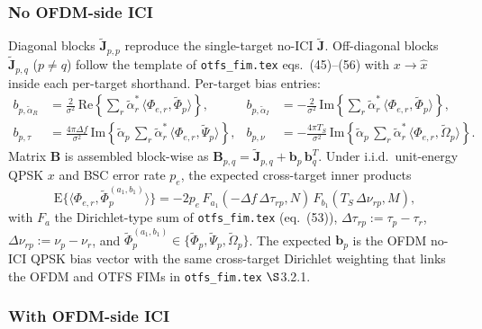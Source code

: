 \documentclass[11pt]{article}
\begin{document}
\subsubsection{No OFDM-side ICI}

Diagonal blocks \(\tilde{\bm{J}}_{p,p}\) reproduce the single-target no-ICI \(\tilde{\bm{J}}\). Off-diagonal blocks \(\tilde{\bm{J}}_{p,q}\) (\(p \neq q\)) follow the template of \texttt{otfs\_fim.tex} eqs.~(45)--(56) with \(x \to \hat{x}\) inside each per-target shorthand. Per-target bias entries:
\begin{align}
    b_{p, \tilde{\alpha}_R} &= \tfrac{2}{\sigma^2}\, \mathrm{Re}\!\left\{ \sum_r \tilde{\alpha}_r^*\, \langle \Phi_{e,r}, \tilde{\Phi}_p\rangle \right\}, &
    b_{p, \tilde{\alpha}_I} &= -\tfrac{2}{\sigma^2}\, \mathrm{Im}\!\left\{ \sum_r \tilde{\alpha}_r^*\, \langle \Phi_{e,r}, \tilde{\Phi}_p\rangle \right\}, \\
    b_{p, \tau} &= \tfrac{4\pi\Delta f}{\sigma^2}\, \mathrm{Im}\!\left\{ \tilde{\alpha}_p\, \sum_r \tilde{\alpha}_r^*\, \langle \Phi_{e,r}, \tilde{\Psi}_p\rangle \right\}, &
    b_{p, \nu} &= -\tfrac{4\pi T_S}{\sigma^2}\, \mathrm{Im}\!\left\{ \tilde{\alpha}_p\, \sum_r \tilde{\alpha}_r^*\, \langle \Phi_{e,r}, \tilde{\Omega}_p\rangle \right\}.
\end{align}
Matrix \(\bm{B}\) is assembled block-wise as \(\bm{B}_{p,q} = \tilde{\bm{J}}_{p,q} + \bm{b}_p\, \bm{b}_q^T\). Under i.i.d.\ unit-energy QPSK \(x\) and BSC error rate \(p_e\), the expected cross-target inner products
\begin{equation}
    \mathrm{E}\{\langle \Phi_{e,r}, \tilde{\Phi}_p^{(a_1,b_1)}\rangle\} = -2 p_e\, F_{a_1}(-\Delta f\, \Delta\tau_{rp}, N)\, F_{b_1}(T_S\, \Delta\nu_{rp}, M),
\end{equation}
with \(F_a\) the Dirichlet-type sum of \texttt{otfs\_fim.tex} (eq.~(53)), \(\Delta\tau_{rp} := \tau_p - \tau_r\), \(\Delta\nu_{rp} := \nu_p - \nu_r\), and \(\tilde{\Phi}_p^{(a_1,b_1)} \in \{\tilde{\Phi}_p, \tilde{\Psi}_p, \tilde{\Omega}_p\}\). The expected \(\bm{b}_p\) is the OFDM no-ICI QPSK bias vector with the same cross-target Dirichlet weighting that links the OFDM and OTFS FIMs in \texttt{otfs\_fim.tex} \(\S\)3.2.1.

\subsubsection{With OFDM-side ICI}
\end{document}
